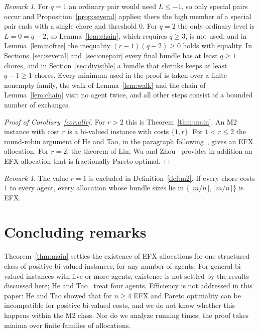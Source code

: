 \documentclass{amsart}
\numberwithin{equation}{section}
\theoremstyle{definition}
\theoremstyle{remark}
\newtheorem{remark}[theorem]{Remark}
\begin{document}
\begin{remark}\label{rem:smallq}
For $q=1$ an ordinary pair would need $L\le-1$, so only special pairs occur and Proposition~\ref{prop:several} applies; there the high member of a special pair ends with a single chore and threshold $0$. For $q=2$ the only ordinary level is $L=0=q-2$, so Lemma~\ref{lem:chain}, which requires $q\ge3$, is not used, and in Lemma~\ref{lem:nofree} the inequality $(r-1)(q-2)\ge0$ holds with equality. In Sections~\ref{sec:several} and~\ref{sec:onepair} every final bundle has at least $q\ge1$ chores, and in Section~\ref{sec:divisible} a bundle that shrinks keeps at least $q-1\ge1$ chores. Every minimum used in the proof is taken over a finite nonempty family, the walk of Lemma~\ref{lem:walk} and the chain of Lemma~\ref{lem:chain} visit no agent twice, and all other steps consist of a bounded number of exchanges.
\end{remark}

\begin{proof}[Proof of Corollary~\ref{cor:allr}]
For $r>2$ this is Theorem~\ref{thm:main}. An M2 instance with cost $r$ is a bi-valued instance with costs $\{1,r\}$. For $1<r\le2$ the round-robin argument of He and Tao, in the paragraph following~\cite[Theorem~3]{HT26}, gives an EFX allocation. For $r=2$, the theorem of Lin, Wu and Zhou~\cite[Theorem~4.1]{LWZ25} provides in addition an EFX allocation that is fractionally Pareto optimal.
\end{proof}

\begin{remark}\label{rem:r1}
The value $r=1$ is excluded in Definition~\ref{def:m2}. If every chore costs $1$ to every agent, every allocation whose bundle sizes lie in $\{\lfloor m/n\rfloor,\lceil m/n\rceil\}$ is EFX.
\end{remark}

\section{Concluding remarks}\label{sec:conclusion}

Theorem~\ref{thm:main} settles the existence of EFX allocations for one structured class of positive bi-valued instances, for any number of agents. For general bi-valued instances with five or more agents, existence is not settled by the results discussed here; He and Tao~\cite{HT26} treat four agents. Efficiency is not addressed in this paper: He and Tao showed that for $n\ge4$ EFX and Pareto optimality can be incompatible for positive bi-valued costs, and we do not know whether this happens within the M2 class. Nor do we analyze running times; the proof takes minima over finite families of allocations.
\end{document}
